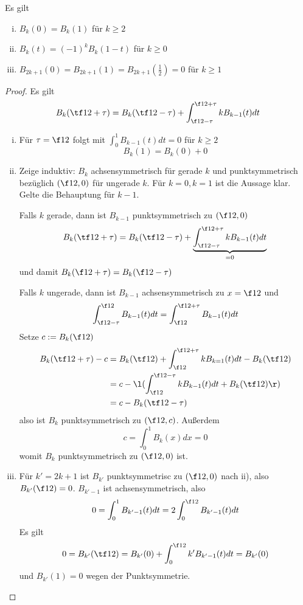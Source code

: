 \documentclass[11pt]{scrbook}
\begin{document}
\begin{lem}[Eigenschaften]
	\label{2.35}
	Es gilt
	\begin{enumerate}[i)]
		\item
			$B_k(0) = B_k(1)$ für $k\ge 2$
		\item
			$B_k(t) = (-1)^k B_k(1-t)$ für $k\ge 0$
		\item
			$B_{2k+1}(0) = B_{2k+1}(1) = B_{2k+1}(\frac 12) = 0$ für $k\ge 1$
	\end{enumerate}
	\begin{proof}
		Es gilt
		\[
			B_k (\tf 12 + \tau) = B_k(\tf 12 - \tau)  + \int_{\f 12 - \tau}^{\f 12 + \tau} k B_{k-1}(t) dt
		\]
		\begin{enumerate}[i)]
			\item
				Für $\tau = \f 12$ folgt mit $\int_{0}^1 B_{k-1}(t) dt = 0$ für $k\ge 2$
				\[
					B_k(1) = B_k(0) + 0
				\]
			\item
				Zeige induktiv: $B_k$ achsensymmetrisch für gerade $k$ und punktsymmetrisch bezüglich $(\f 12,0)$ für ungerade $k$.
				Für $k=0, k=1$ ist die Aussage klar.
				Gelte die Behauptung für $k-1$.

				Falls $k$ gerade, dann ist $B_{k-1}$ punktsymmetrisch zu $(\f 12, 0)$
				\[
					B_k (\tf 12 + \tau) = B_k(\tf 12 - \tau)  + \underbrace{\int_{\f 12 - \tau}^{\f 12 + \tau} k B_{k-1}(t) dt}_{=0}
				\]
				und damit $B_k(\f 12 + \tau) = B_k(\f 12 - \tau)$

				Falls $k$ ungerade, dann ist $B_{k-1}$ achsensymmetrisch zu $x=\f 12$ und
				\[
					\int_{\f 12 - \tau}^{\f 12} B_{k-1}(t) dt = \int_{\f 12}^{\f 12 + \tau} B_{k-1}(t) dt
				\]
				Setze $c := B_k(\f 12)$
				\begin{align*}
					B_k(\tf 12 + \tau) - c 
					&= B_k (\tf 12) + \int_{\f 12}^{\f 12 + \tau} k B_{k=1}(t) dt - B_k(\tf 12) \\
					&= c - \l( \int_{\f 12}^{\f 12 - \tau} k B_{k-1}(t) dt + B_k( \tf 12) \r) \\
					&= c - B_k(\tf 12 - \tau)
				\end{align*}
				also ist $B_k$ punktsymmetrisch zu $(\f 12, c)$.
				Außerdem
				\[
					c = \int_{0}^1 B_k(x) dx = 0
				\]
				womit $B_k$ punktsymmetrisch zu $(\f 12,0)$ ist.
			\item
				Für $k'=2k+1$ ist $B_{k'}$ punktsymmetrisc zu $(\f 12,0)$ nach ii), also $B_{k'}(\f 12) = 0$.
				$B_{k'-1}$ ist achsensymmetrisch, also
				\[
					0 = \int_0^1 B_{k'-1}(t) dt = 2 \int_0^{\f 12} B_{k'-1} (t) dt 
				\]
				Es gilt
				\[
					0 = B_{k'}(\tf 12) = B_{k'}(0) + \int_{0}^{\f 12} k' B_{k'-1}(t) dt = B_{k'}(0)
				\]
				und $B_{k'}(1) = 0$ wegen der Punktsymmetrie.
		\end{enumerate}
	\end{proof}
\end{lem}
\end{document}
